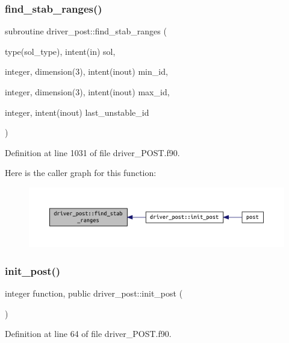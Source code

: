 \subsubsection{\texorpdfstring{find\+\_\+stab\+\_\+ranges()}{find\_stab\_ranges()}}
{\footnotesize\ttfamily subroutine driver\+\_\+post\+::find\+\_\+stab\+\_\+ranges (\begin{DoxyParamCaption}\item[{type(sol\+\_\+type), intent(in)}]{sol,  }\item[{integer, dimension(3), intent(inout)}]{min\+\_\+id,  }\item[{integer, dimension(3), intent(inout)}]{max\+\_\+id,  }\item[{integer, intent(inout)}]{last\+\_\+unstable\+\_\+id }\end{DoxyParamCaption})}



Definition at line 1031 of file driver\+\_\+\+P\+O\+S\+T.\+f90.

Here is the caller graph for this function\+:
\nopagebreak
\begin{figure}[H]
\begin{center}
\leavevmode
\includegraphics[width=350pt]{namespacedriver__post_a51ecad1032e415d2a8e6e5b97d2c7e09_icgraph}
\end{center}
\end{figure}
\mbox{\label{namespacedriver__post_af527706d4e696d4e507443d2f74194ef}} 
\subsubsection{\texorpdfstring{init\+\_\+post()}{init\_post()}}
{\footnotesize\ttfamily integer function, public driver\+\_\+post\+::init\+\_\+post (\begin{DoxyParamCaption}{ }\end{DoxyParamCaption})}



Definition at line 64 of file driver\+\_\+\+P\+O\+S\+T.\+f90.

